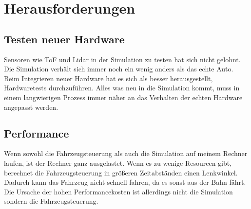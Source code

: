 \section{Herausforderungen}
\subsection*{Testen neuer Hardware}
Sensoren wie ToF und Lidar in der Simulation zu testen hat sich nicht gelohnt. 
Die Simulation verhält sich immer noch ein wenig anders als das echte Auto.
Beim Integrieren neuer Hardware hat es sich als besser herausgestellt, Hardwaretests durchzuführen.
Alles was neu in die Simulation kommt, muss in einem langwierigen Prozess immer näher an das Verhalten der echten Hardware angepasst werden.  
\subsection*{Performance}
Wenn sowohl die Fahrzeugsteuerung als auch die Simulation auf meinem Rechner laufen, ist der Rechner ganz ausgelastet.
Wenn es zu wenige Resourcen gibt, berechnet die Fahrzeugsteuerung in größeren Zeitabständen einen Lenkwinkel.
Dadurch kann das Fahrzeug nicht schnell fahren, da es sonst aus der Bahn fährt.
Die Ursache der hohen Performancekosten ist allerdings nicht die Simulation sondern die Fahrzeugsteuerung.
